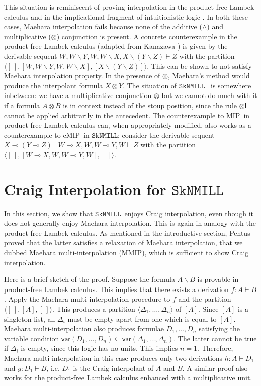 \documentclass[sn-mathphys-num]{sn-jnl}%
\newcommand{\GD}{\Delta}
\newcommand{\vd}{\vdash}
\newcommand{\tl}{\otimes \mathsf{L}}
\newcommand{\ot}{\otimes}
\newcommand{\lolli}{\multimap}
\newcommand{\bsls}{\backslash}
\newcommand{\SkNMILL}{$\mathtt{SkNMILL}$}
\newcommand{\mf}[1]{\mathsf{#1}}
\newcommand{\vars}[1]{\mf{var} (#1)}
\newcommand{\MIP}{\textsf{MIP}}
\newcommand{\MMIP}{\textsf{MMIP}}
\newcommand{\cMIP}{\textsf{cMIP}}
\theoremstyle{thmstyleone}%
\theoremstyle{thmstyletwo}%
\theoremstyle{thmstylethree}%
\begin{document}
This situation is reminiscent of proving interpolation in the product-free Lambek calculus \cite{Pentus1997} and in the implicational fragment of intuitionistic logic \cite{Kanazawa2006}.
In both these cases, Maehara interpolation fails because none of the additive ($\land$) and multiplicative ($\ot$) conjunction is present.
A concrete counterexample in the product-free Lambek calculus (adapted from Kanazawa \cite{Kanazawa2006}) is given by the derivable sequent $W, W\bsls Y, W , W \bsls X , X \bsls (Y \bsls Z) \vd Z$ with the partition $\langle [\ ] , [W, W\bsls Y, W , W \bsls X], [X \bsls (Y \bsls Z)] \rangle$. This can be shown to not satisfy Maehara interpolation property. In the presence of $\ot$,  Maehara's method would produce the interpolant formula $X \ot Y$. The situation of \SkNMILL~ is somewhere inbetween: we have a multiplicative conjunction $\ot$ but we cannot do much with it if a formula $A \ot B$ is in context instead of the stoup position, since the rule $\tl$ cannot be applied arbitrarily in the antecedent.
The counterexample to \MIP~in product-free Lambek calculus can, when appropriately modified, also works as a counterexample to \cMIP~in \SkNMILL: consider the derivable sequent  $X \lolli (Y \lolli Z) \mid W \lolli X, W , W \lolli Y, W \vd Z$ with the partition $\langle [\ ] , [W \lolli X, W , W \lolli Y, W], [\ ] \rangle$.

\section{Craig Interpolation for \SkNMILL}\label{sec:interpolation}

In this section, we show that \SkNMILL~enjoys Craig interpolation, even though it does not generally enjoy Maehara interpolation.
This is again in analogy with the product-free Lambek calculus. 
As mentioned in the introductive section, Pentus \cite{Pentus1997} proved that the latter satisfies a relaxation of Maehara interpolation, that we dubbed Maehara multi-interpolation (\MMIP), which is sufficient to show Craig interpolation. 

Here is a brief sketch of the proof. 
Suppose the formula $A \bsls B$ is provable in product-free Lambek calculus.
This implies that there exists a derivation $f : A \vd B$.
Apply the Maehara multi-interpolation procedure to $f$ and the partition $\langle [\ ],[A],[\ ]\rangle$.
This produces a partition $\langle \GD_1,\dots,\GD_n \rangle$ of $[A]$.
Since $[A]$ is a singleton list, all $\GD_i$ must be empty apart from one which is equal to $[A]$.
Maehara multi-interpolation also produces formulae $D_1,\dots,D_n$ satisfying the variable condition $\vars{D_1, \dots, D_n} \subseteq \vars{\GD_1 , \dots , \GD_n}$. 
The latter cannot be true if $\GD_i$ is empty, since this logic has no units.
This implies $n = 1$.
Therefore, Maehara multi-interpolation in this case produces only two derivations $h : A \vd D_1$ and $g : D_1 \vd B$, i.e. $D_1$ is the Craig interpolant of $A$ and $B$.
A similar proof also works for the product-free Lambek calculus enhanced with a multiplicative unit.
\end{document}
